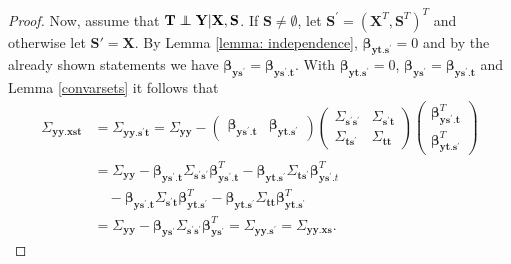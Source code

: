 \documentclass[11pt,a4paper]{article}
\theoremstyle{definition}
\theoremstyle{remark}
\newcommand\ci{\protect\mathpalette{\protect\independenT}{\perp}}
\def\independenT#1#2{\mathrel{\rlap{$#1#2$}\mkern2mu{#1#2}}}
\begin{document}
\begin{proof}
Now, assume that $\mathbf{T} \ci \mathbf{Y}| \mathbf{X} , \mathbf{S}$. If $\mathbf{S}\neq \emptyset$, let $\mathbf{S}^{\prime}= (\mathbf{X}^T,\mathbf{S}^T)^T$ and otherwise let $\mathbf{S}' =\mathbf{X}$. By Lemma \ref{lemma: independence}, $\boldsymbol{\beta}_{\mathbf{yt}.\mathbf{s}^{\prime}}=0$ and by the already shown statements we have
$
\boldsymbol{\beta}_{\mathbf{ys}^{\prime}} = 
\boldsymbol{\beta}_{\mathbf{ys}^{\prime}.\mathbf{t}}.$
With $\boldsymbol{\beta}_{\mathbf{yt}.\mathbf{s}^{\prime}}=0$, $
\boldsymbol{\beta}_{\mathbf{ys}^{\prime}} = 
\boldsymbol{\beta}_{\mathbf{ys}^{\prime}.\mathbf{t}}$ and Lemma \ref{convarsets} it follows that
\begin{align*}
\Sigma_{\mathbf{yy}.\mathbf{xst}} &= \Sigma_{\mathbf{yy}.\mathbf{s}^{\prime}\mathbf{t}}
 = \Sigma_{\mathbf{yy}} - 
\begin{pmatrix}\boldsymbol{\beta}_{\mathbf{y}\mathbf{s}^{\prime}.\mathbf{t}} & \boldsymbol{\beta}_{\mathbf{y}\mathbf{t}.\mathbf{s}^{\prime}} \end{pmatrix}
\left(
\begin{array}{cc}
\Sigma_{\mathbf{s}^{\prime}\mathbf{s}^{\prime}}  & \Sigma_{\mathbf{s}^{\prime}\mathbf{t}} \\
\Sigma_{\mathbf{t}\mathbf{s}^{\prime}} & \Sigma_{\mathbf{t}\mathbf{t}} 
\end{array}
\right)
\begin{pmatrix}\boldsymbol{\beta}_{\mathbf{y}\mathbf{s}^{\prime}.\mathbf{t}}^T \\ \boldsymbol{\beta}_{\mathbf{y}\mathbf{t}.\mathbf{s}^{\prime}}^T \end{pmatrix}
\nonumber\\ 
&= \Sigma_{\mathbf{yy}} - \boldsymbol{\beta}_{\mathbf{y}\mathbf{s}^{\prime}.\mathbf{t}} \Sigma_{\mathbf{s}^{\prime}\mathbf{s}^{\prime}} \boldsymbol{\beta}^T_{\mathbf{y}\mathbf{s}^{\prime}.\mathbf{t}}  - \boldsymbol{\beta}_{\mathbf{y}\mathbf{t}.\mathbf{s}^{\prime}} \Sigma_{\mathbf{t}\mathbf{s}^{\prime}} \boldsymbol{\beta}^{T}_{\mathbf{y}\mathbf{s}^{\prime}.t} \nonumber \\
& \quad - \boldsymbol{\beta}_{\mathbf{y}\mathbf{s}^{\prime}.\mathbf{t}}  \Sigma_{\mathbf{s}^{\prime}\mathbf{t}} \boldsymbol{\beta}^T_{\mathbf{y}\mathbf{t}.\mathbf{s}^{\prime}}
- \boldsymbol{\beta}_{\mathbf{y}\mathbf{t}.\mathbf{s}^{\prime}}  \Sigma_{\mathbf{tt}} \boldsymbol{\beta}^T_{\mathbf{y}\mathbf{t}.\mathbf{s}^{\prime}}
\nonumber\\
&= \Sigma_{\mathbf{yy}} - \boldsymbol{\beta}_{\mathbf{y}\mathbf{s}^{\prime}} \Sigma_{\mathbf{s}^{\prime}\mathbf{s}^{\prime}} \boldsymbol{\beta}^T_{\mathbf{y}\mathbf{s}^{\prime}} 
= \Sigma_{\mathbf{yy}.\mathbf{s}^{\prime}} =\Sigma_{\mathbf{yy}.\mathbf{xs}}.
\end{align*}

\end{proof}
\end{document}
